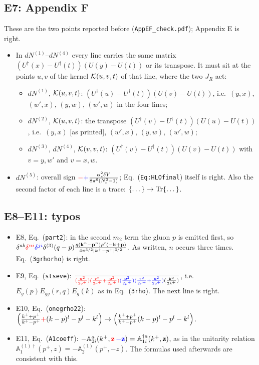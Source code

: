 \documentclass[10pt]{article}
\def\mf#1{\mathbb{#1}}
\def\v#1{\mathbf{#1}}
\newcommand{\old}[1]{{\color{red}#1}}
\newcommand{\new}[1]{{\color{blue}#1}}
\newcommand{\eqn}[1]{Eq.~(\texttt{#1})}
\begin{document}
\subsection{E7: Appendix F}
These are the two points reported before (\texttt{AppEF\_check.pdf}); Appendix E is right.
\begin{itemize}
\item In $dN^{(1)}$--$dN^{(4)}$ every line carries the same matrix $(U^\dagger(x)-U^\dagger(t))(U(y)-U(t))$ or its transpose. It must sit at the points $u,v$ of the kernel ${\cal K}(u,v,t)$ of that line, where the two $J_R$ act:
\begin{itemize}
\item $dN^{(1)}$, ${\cal K}(u,v,t)$: $(U^\dagger(u)-U^\dagger(t))(U(v)-U(t))$, i.e.\ $(y,x)$, $(w',x)$, $(y,w)$, $(w',w)$ in the four lines;
\item $dN^{(2)}$, ${\cal K}(u,v,t)$: the transpose $(U^\dagger(v)-U^\dagger(t))(U(u)-U(t))$, i.e.\ $(y,x)$ [as printed], $(w',x)$, $(y,w)$, $(w',w)$;
\item $dN^{(3)}$, $dN^{(4)}$, ${\cal K}(v,v,t)$: $(U^\dagger(v)-U^\dagger(t))(U(v)-U(t))$ with $v=y,w'$ and $v=x,w$.
\end{itemize}
\item $dN^{(5)}$: overall sign $\old{-}\new{+}\frac{\alpha_s^2\delta Y}{8\pi^6(N_c^2-1)}$; \eqn{Eq:HLOfinal} itself is right. Also the second factor of each line is a trace: $\{\dots\}\to{\rm Tr}\{\dots\}$.
\end{itemize}

\subsection{E8--E11: typos}
\begin{itemize}
\item E8, \eqn{part2}: in the second $m_2$ term the gluon $p$ is emitted first, so $\delta^{ab}\old{\delta^{ni}}\new{\delta^{ji}}\delta^{(3)}(q-p)\frac{g(\v k^n-\v p^n)\rho^c(-\v k+\v p)}{4\pi^{3/2}|k^+-p^+|^{3/2}}$. As written, $n$ occurs three times. \eqn{3grhorho} is right.
\item E9, \eqn{stseve}: $\frac{1}{\old{(\frac{\v q^2}{2q^+})(\frac{\v r^2}{2r^+}+\frac{\v p^2}{2p^+})}\new{(\frac{\v p^2}{2p^+})(\frac{\v r^2}{2r^+}+\frac{\v q^2}{2q^+})}(\frac{\v k^2}{2k^+})}$, i.e.\ $E_g(p)E_{gg}(r,q)E_g(k)$ as in \eqn{3rho}. The next line is right.
\item E10, \eqn{onegrho22}: $\Big(\frac{k^++p^+}{k^+-p^+}\old{+}(k-p)^l-p^l-k^l\Big)\to\Big(\frac{k^++p^+}{k^+-p^+}(k-p)^l-p^l-k^l\Big)$.
\item E11, \eqn{A1coeff}: $-\mf A^a_{2i}(k^+,\old{\v z}\,\new{-\v z})=\mf A^{\dagger a}_{1i}(k^+,\v z)$, as in the unitarity relation\\ $\mf A^{(1)\dagger}_1(p^+,z)=-\mf A^{(1)}_2(p^+,-z)$. The formulas used afterwards are consistent with this.
\end{itemize}
\end{document}
